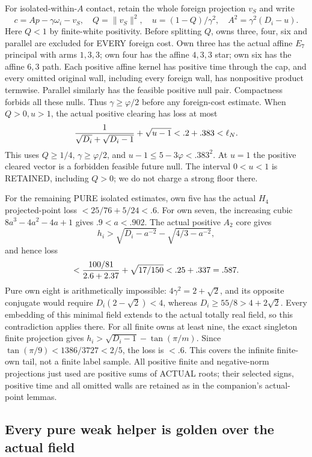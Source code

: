 \documentclass[11pt]{article}
\begin{document}
For isolated-within-\(A\) contact, retain the whole foreign
projection \(v_S\) and write
\[
 c=Ap-\gamma\omega_i-v_S,\quad Q=\|v_S\|^2,\quad
 u=(1-Q)/\gamma^2,\quad A^2=\gamma^2(D_i-u).
\]
Here \(Q<1\) by finite-white positivity.
Before splitting \(Q\), owns three, four, six and parallel
are excluded for EVERY foreign cost.
Own three has the actual affine \(E_7\) principal with arms
\(1,3,3\); own four has the affine \(4,3,3\) star;
own six has the affine \(6,3\) path.
Each positive affine kernel has positive time through the cap,
and every omitted original wall, including every foreign wall,
has nonpositive product termwise.
Parallel similarly has the feasible positive null pair.
Compactness forbids all these nulls.
Thus \(\gamma\ge\varphi/2\) before any foreign-cost estimate.
When \(Q>0,u>1\), the actual positive clearing has loss at most
\[
 {1\over\sqrt{D_i}+\sqrt{D_i-1}}+\sqrt{u-1}
 <.2+.383<\ell_N .
\]
This uses \(Q\ge1/4\), \(\gamma\ge\varphi/2\), and
\(u-1\le5-3\varphi<.383^2\).
At \(u=1\) the positive cleared vector is a forbidden feasible
future null.
The interval \(0<u<1\) is RETAINED, including \(Q>0\);
we do not charge a strong floor there.

For the remaining PURE isolated estimates, own five has the
actual \(H_4\) projected-point loss
\(<25/76+5/24<.6\).
For own seven, the increasing cubic
\(8a^3-4a^2-4a+1\) gives \(.9<a<.902\).
The actual positive \(A_2\) core gives
\[
 h_i>\sqrt{D_i-a^{-2}}-\sqrt{4/3-a^{-2}},
\]
and hence loss
\[
 <{100/81\over2.6+2.37}+\sqrt{17/150}
 <.25+.337=.587 .
\]
Pure own eight is arithmetically impossible:
\(4\gamma^2=2+\sqrt2\), and its opposite conjugate would require
\(D_i(2-\sqrt2)<4\), whereas
\(D_i\ge55/8>4+2\sqrt2\).
Every embedding of this minimal field extends to the actual
totally real field, so this contradiction applies there.
For all finite owns at least nine, the exact singleton finite
projection gives
\(h_i>\sqrt{D_i-1}-\tan(\pi/m)\).
Since \(\tan(\pi/9)<1386/3727<2/5\), the loss is \(<.6\).
This covers the infinite finite-own tail, not a finite label sample.
All positive finite and negative-norm projections just used are
positive sums of ACTUAL roots; their selected signs, positive
time and all omitted walls are retained as in the companion's
actual-point lemmas.

\subsection{Every pure weak helper is golden over the actual field}
\label{app:arithgoldenfield}
\end{document}
